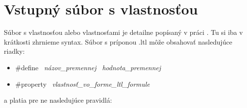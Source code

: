 \documentclass[11pt,final,oneside]{fithesis}
\begin{document}
\section{Vstupn\'y s\'ubor s vlastnos\v tou}
S\'ubor s vlastnos\v tou alebo vlastnos\v tami je detailne pop\'isan\'y v pr\'aci \cite{Jaros-thesis}. Tu si iba v kr\'atkosti zhrnieme syntax. S\'ubor 
s pr\'iponou .ltl m\^ o\v ze obsahova\v t nasleduj\'uce riadky:
\begin{itemize}
\item \#define \ {\it n\'azov\_premennej \ hodnota\_premennej}
\item \#property \ {\it vlastnos\v t\_vo\_forme\_ltl\_formule}
\end{itemize}
a platia pre ne nasleduj\'uce pravidl\'a:
\end{document}
